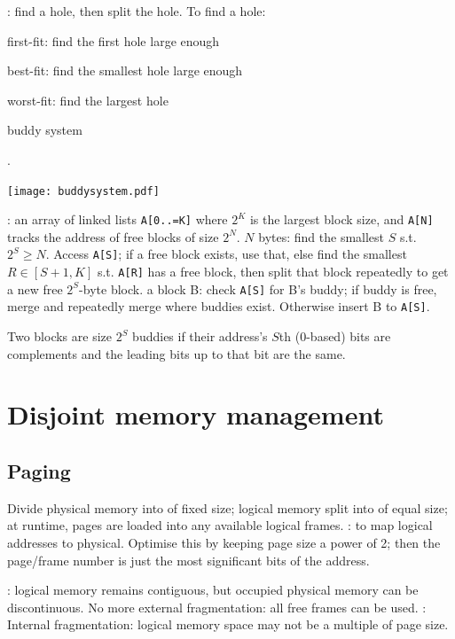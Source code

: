 \documentclass[fontsize=9pt]{slnotes}
\newcommand\benefits{\checkmark}
\newcommand\problems{\textsymbol{✗}}
\begin{document}
: find a hole, then split the hole. To find a hole: \begin{slinenumor}
\item first-fit: find the first hole large enough
\item best-fit: find the smallest hole large enough
\item worst-fit: find the largest hole
\item buddy system
\end{slinenumor}.


\texttt{[image: buddysystem.pdf]}

: an array of linked lists \texttt{A[0..=K]} where \(2^K\) is the largest block size, and \texttt{A[N]} tracks the address of free blocks of size \(2^N\).  \(N\) bytes: find the smallest \(S\) s.t. \(2^S \ge N\). Access \texttt{A[S]}; if a free block exists, use that, else find the smallest \(R \in [S+1, K]\) s.t. \texttt{A[R]} has a free block, then split that block repeatedly to get a new free \(2^S\)-byte block.  a block B: check \texttt{A[S]} for B's buddy; if buddy is free, merge and repeatedly merge where buddies exist. Otherwise insert B to \texttt{A[S]}.

Two blocks are size \(2^S\) buddies if their address's \(S\)th (0-based) bits are complements and the leading bits up to that bit are the same.

\section{Disjoint memory management}
\subsection{Paging}
Divide physical memory into  of fixed size; logical memory split into  of equal size; at runtime, pages are loaded into any available logical frames.  :  to map logical addresses to physical. Optimise this by keeping page size a power of 2; then the page/frame number is just the most significant bits of the address.

\benefits: logical memory remains contiguous, but occupied physical memory can be discontinuous. No more external fragmentation: all free frames can be used. \problems: Internal fragmentation: logical memory space may not be a multiple of page size.
\end{document}

